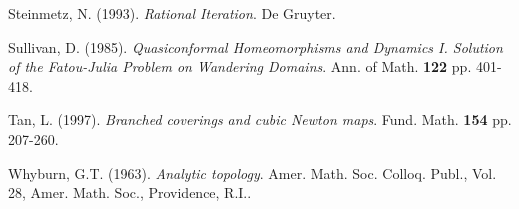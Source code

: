  {\sc Steinmetz, N.} (1993). {\em Rational Iteration}. De Gruyter.

 {\sc Sullivan, D.} (1985). {\em Quasiconformal Homeomorphisms and Dynamics I. Solution of the Fatou-Julia Problem on Wandering Domains}. Ann. of Math. {\bf 122} pp. 401-418.

 {\sc Tan, L.} (1997). {\em Branched coverings and cubic Newton maps}. Fund. Math. {\bf 154} pp. 207-260.

 {\sc Whyburn, G.T.} (1963). {\em Analytic topology}. Amer. Math. Soc. Colloq. Publ., Vol. 28, Amer. Math. Soc., Providence, R.I..


\fi
